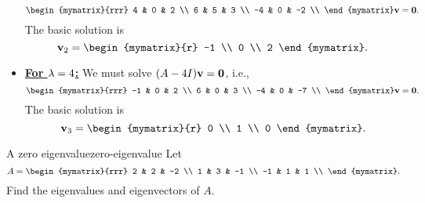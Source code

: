 \begin{solution}
\begin{itemize}
\begin{equation*}
\begin{mymatrix}{rrr}
        4  & 0 &  2 \\
        6  & 5 &  3 \\
        -4 & 0 & -2 \\
      \end{mymatrix}\vect{v}=\vect{0}.
    \end{equation*}
    The basic solution is
    \begin{equation*}
      \vect{v}_2 = \begin{mymatrix}{r} -1 \\ 0 \\ 2 \end{mymatrix}.
    \end{equation*}
  \item {\bf{\underline{For $\lambda=4$:}}} We must solve
    $(A-4I)\mbox{\bf v}=\mbox{\bf 0}$, i.e.,
    \begin{equation*}
      \begin{mymatrix}{rrr}
        -1  & 0 &  2 \\
        6  & 0 &  3 \\
        -4 & 0 & -7 \\
      \end{mymatrix}\vect{v}=\vect{0}.
    \end{equation*}
    The basic solution is
    \begin{equation*}
      \vect{v}_3 = \begin{mymatrix}{r} 0 \\ 1 \\ 0 \end{mymatrix}.
    \end{equation*}
  \end{itemize}
\end{solution}

\begin{example}{A zero eigenvalue}{zero-eigenvalue}
  Let
  \begin{equation*}
    A=\begin{mymatrix}{rrr}
      2 & 2 & -2 \\
      1 & 3 & -1 \\
      -1 & 1 & 1 \\
    \end{mymatrix}.
  \end{equation*}
  Find the eigenvalues and eigenvectors of $A$.
\end{example}


